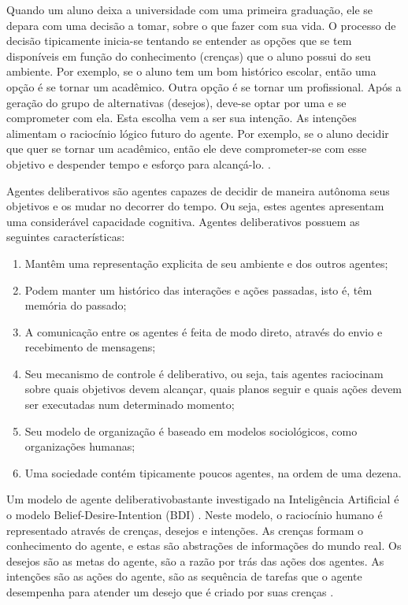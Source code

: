 
Quando um aluno deixa a universidade com uma primeira graduação, ele se depara com uma decisão a tomar, sobre o que fazer com sua vida. O processo de decisão tipicamente inicia-se tentando se entender as opções que se tem disponíveis em função do conhecimento (crenças) que o aluno possui do seu ambiente. Por exemplo, se o aluno tem um bom histórico escolar, então uma opção é se tornar um acadêmico. Outra opção é se tornar um profissional. Após a geração do grupo de alternativas (desejos), deve-se optar por uma e se comprometer com ela. Esta escolha vem a ser sua intenção. As intenções alimentam o raciocínio lógico futuro do agente. Por exemplo, se o aluno decidir que quer se tornar um acadêmico, então ele deve comprometer-se com esse objetivo e despender tempo e esforço para alcançá-lo. .

Agentes deliberativos são agentes capazes de decidir de maneira autônoma seus objetivos e os mudar no decorrer do tempo. Ou seja, estes agentes apresentam uma considerável capacidade cognitiva. Agentes deliberativos possuem as seguintes características:
\begin{citacao}
\begin{enumerate}

	\item Mantêm uma representação explicita de seu ambiente e dos outros agentes;
	\item Podem manter um histórico das interações e ações passadas, isto é, têm memória do passado;
	\item A comunicação entre os agentes é feita de modo direto, através do envio e recebimento de mensagens;
	\item Seu mecanismo de controle é deliberativo, ou seja, tais agentes raciocinam sobre quais objetivos devem alcançar, quais planos seguir e quais ações devem ser executadas num determinado momento;
	\item Seu modelo de organização é baseado em modelos sociológicos, como organizações humanas;
	\item Uma sociedade contém tipicamente poucos agentes, na ordem de uma dezena.
	 \newline {}

\end{enumerate}
\end{citacao}

Um modelo de agente deliberativobastante investigado na Inteligência Artificial é o modelo Belief-Desire-Intention (BDI) . Neste modelo, o raciocínio humano é representado através de crenças, desejos e intenções. As crenças formam o conhecimento do agente, e estas são abstrações de informações do mundo real. Os desejos são as metas do agente, são a razão por trás das ações dos agentes. As intenções são as ações do agente, são as sequência de tarefas que o agente desempenha para atender um desejo que é criado por suas crenças \cite[p. 31]{serrano2011}.

